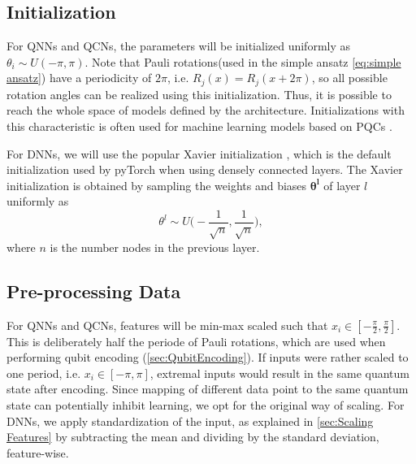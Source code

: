 \subsection{Initialization}\label{sec:Initialization}
For QNNs and QCNs, the parameters will be initialized uniformly as $\theta_i \sim U(-\pi, \pi)$. Note that Pauli rotations(used in the simple ansatz \cref{eq:simple ansatz}) have a periodicity of $2\pi$, i.e. $R_j(x) = R_j(x+2\pi)$, so all possible rotation angles can be realized using this initialization. Thus, it is possible to reach the whole space of models defined by the architecture. Initializations with this characteristic is often used for machine learning models based on PQCs \cite{abbas2020power, skolik2020layerwise}.

For DNNs, we will use the popular Xavier initialization \cite{xavier}, which is the default initialization used by pyTorch\cite{pytorch} when using densely connected layers. The Xavier initialization is obtained by sampling the weights and biases $\boldsymbol{\theta^{l}}$ of layer $l$ uniformly as 
\begin{equation}
    \theta^{l} \sim U\big(-\frac{1}{\sqrt{n}},\frac{1}{\sqrt{n}}\big),
\end{equation}
where $n$ is the number nodes in the previous layer. 

\subsection{Pre-processing Data}\label{sec:Pre-processing Input}
For QNNs and QCNs, features will be min-max scaled such that $x_i \in [-\frac{\pi}{2}, \frac{\pi}{2}]$. This is deliberately half the periode of Pauli rotations, which are used when performing qubit encoding (\cref{sec:QubitEncoding}). If inputs were rather scaled to one period, i.e. $x_i \in [-\pi, \pi]$, extremal inputs would result in the same quantum state after encoding. Since mapping of different data point to the same quantum state can potentially inhibit learning, we opt for the original way of scaling. 
For DNNs, we apply standardization of the input, as explained in \cref{sec:Scaling Features} by subtracting the mean and dividing by the standard deviation, feature-wise.

